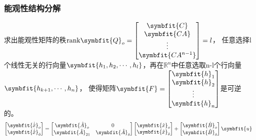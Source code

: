 \documentclass[11pt,a4paper]{ctexart}
\newcommand{\bm}{\symbfit}
\begin{document}
        \subsubsection{能观性结构分解}
            求出能观性矩阵的秩${\rm rank}\bm{Q}_o=\begin{bmatrix}\bm{C}\\ \bm{CA}\\ \vdots \\ \bm{CA^{n-1}}\end{bmatrix}=l$，
            任意选择l个线性无关的行向量$\bm{h_1,h_2,\cdots,h_l}$，再在$\mathbb{R}^n$中任意选取n-l个行向量$\bm{h_{k+1},\cdots,h_n}$，
            使得矩阵$\bm{F}=\begin{bmatrix}\bm{h}_1\\ \bm{h}_2\\ \vdots \\ \bm{h}_n\end{bmatrix}$是可逆的。
            \[
            \begin{bmatrix}\bm{\dot{\hat x}}_o\\\bm{\dot{\hat x}}_{\bar o}\end{bmatrix}=
            \begin{bmatrix}\bm{\hat A}_o & 0\\ \bm{\hat A}_{21} & \bm{\hat A}_{\bar o}\end{bmatrix}\begin{bmatrix}\bm{\hat x}_o\\\bm{\hat x}_{\hat o}\end{bmatrix}
            +\begin{bmatrix}\bm{\hat B}_o\\\bm{\hat B}_{\bar o}\end{bmatrix}\bm{u}
            \]
\end{document}
